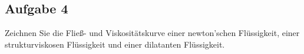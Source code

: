 \documentclass[a4paper,11pt]{article}
\newif\ifshowme
\begin{document}
%
%



\subsection*{Aufgabe 4}
Zeichnen Sie die Fließ- und Viskositätskurve einer newton'schen Flüssigkeit, einer
strukturviskosen Flüssigkeit und einer dilatanten Flüssigkeit.
\ppbig
\end{document}
